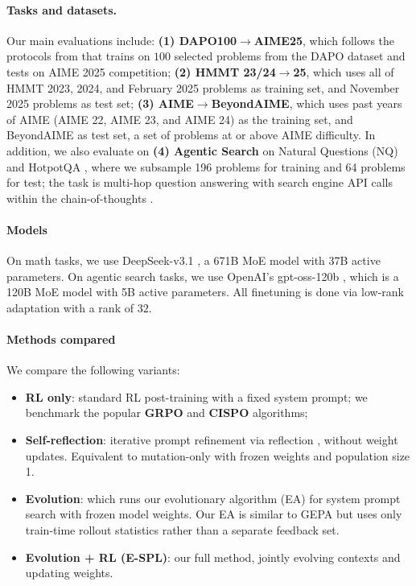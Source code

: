 \documentclass{article}
\theoremstyle{plain}
\theoremstyle{definition}
\theoremstyle{remark}
\begin{document}
\paragraph{Tasks and datasets.}
Our main evaluations include: \textbf{(1) DAPO100$\rightarrow$AIME25}, which follows the protocols from \citep{train-free-grpo} that trains on $100$ selected problems from the DAPO dataset \citep{dapo} and tests on AIME 2025 competition; \textbf{(2) HMMT 23/24$\rightarrow$25}, which uses all of HMMT 2023, 2024, and February 2025 problems as training set, and November 2025 problems as test set; \textbf{(3) AIME$\rightarrow$BeyondAIME}, which uses past years of AIME (AIME 22, AIME 23, and AIME 24) as the training set, and BeyondAIME \citep{beyondaime} as test set, a set of problems at or above AIME difficulty. In addition, we also evaluate on \textbf{(4) Agentic Search} on Natural Questions (NQ) \citep{nq} and HotpotQA \citep{hotpotqa}, where we subsample 196 problems for training and 64 problems for test; the task is multi-hop question answering with search engine API calls within the chain-of-thoughts \citep{search-r1}.

\vspace{-6pt}
\paragraph{Models} On math tasks, we use DeepSeek-v3.1 \citep{deepseekv3}, a 671B MoE \citep{moe} model with 37B active parameters. On agentic search tasks, we use OpenAI's gpt-oss-120b \citep{openai-gpt-oss}, which is a 120B MoE model with 5B active parameters. All finetuning is done via low-rank adaptation \citep{lora} with a rank of $32$.

\vspace{-6pt}
\paragraph{Methods compared} We compare the following variants:
\vspace{-6pt}
\begin{itemize}
    \item \textbf{RL only}: standard RL post-training with a fixed system prompt; we benchmark the popular \textbf{GRPO} \citep{grpo} and \textbf{CISPO} \citep{cispo} algorithms;
    \item \textbf{Self-reflection}: iterative prompt refinement via reflection \citep{reflexion, train-free-grpo, reasoningbank}, without weight updates. Equivalent to mutation-only with frozen weights and population size 1.
    \item \textbf{Evolution}: which runs our evolutionary algorithm (EA) for system prompt search with frozen model weights. Our EA is similar to GEPA \citep{gepa} but uses only train-time rollout statistics rather than a separate feedback set.
    \item \textbf{Evolution + RL (E-SPL)}: our full method, jointly evolving contexts and updating weights.
\end{itemize}
\end{document}
